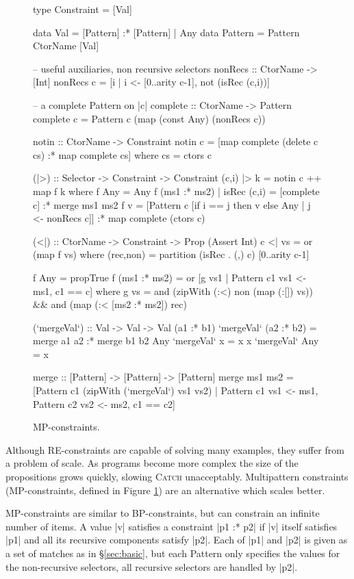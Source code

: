 \documentclass[preprint]{sigplanconf}
\newcommand{\C}[1]{\textsf{#1}}
\newcommand{\catch}{\textsc{Catch}}
\begin{document}
\begin{figure}
\begin{code}
type Constraint = [Val]

data Val      =  [Pattern] :* [Pattern]
              |  Any
data Pattern  =  Pattern CtorName [Val]

-- useful auxiliaries, non recursive selectors
nonRecs :: CtorName -> [Int]
nonRecs c = [i | i <- [0..arity c-1], not (isRec (c,i))]

-- a complete Pattern on |c|
complete :: CtorName -> Pattern
complete c = Pattern c (map (const Any) (nonRecs c))

notin :: CtorName -> Constraint
notin c = [map complete (delete c cs) :* map complete cs]
    where cs = ctors c

(|>) :: Selector -> Constraint -> Constraint
(c,i) |> k = notin c ++ map f k
    where
    f Any = Any
    f (ms1 :* ms2) | isRec (c,i) = [complete c] :* merge ms1 ms2
    f v =  [Pattern c [if i == j then v else Any | j <- nonRecs c]]
           :* map complete (ctors c)

(<|) :: CtorName -> Constraint -> Prop (Assert Int)
c <| vs = or (map f vs)
    where
    (rec,non) = partition (isRec . (,) c) [0..arity c-1]

    f Any = propTrue
    f (ms1 :* ms2) = or [g vs1 | Pattern c1 vs1 <- ms1, c1 == c]
        where g vs =  and (zipWith (:<) non (map (:[]) vs)) &&
                      and (map (:< [ms2 :* ms2]) rec)

(`mergeVal`) :: Val -> Val -> Val
(a1 :* b1) `mergeVal` (a2 :* b2)  = merge a1 a2 :* merge b1 b2
Any        `mergeVal` x           = x
x          `mergeVal` Any         = x

merge :: [Pattern] -> [Pattern] -> [Pattern]
merge  ms1 ms2 = [Pattern c1 (zipWith (`mergeVal`) vs1 vs2) |
       Pattern c1 vs1 <- ms1, Pattern c2 vs2 <- ms2, c1 == c2]
\end{code}
\caption{MP-constraints.}
\label{fig:enumeration}
\end{figure}

Although RE-constraints are capable of solving many examples, they suffer from a problem of scale. As programs become more complex the size of the propositions grows quickly, slowing \catch{} unacceptably. Multipattern constraints (MP-constraints, defined in Figure \ref{fig:enumeration}) are an alternative which scales better.

MP-constraints are similar to BP-constraints, but can constrain an infinite number of items. A value |v| satisfies a constraint |p1 :* p2| if |v| itself satisfies |p1| and all its recursive components satisfy |p2|. Each of |p1| and |p2| is given as a set of matches as in \S\ref{sec:basic}, but each \C{Pattern} only specifies the values for the non-recursive selectors, all recursive selectors are handled by |p2|.
\end{document}
